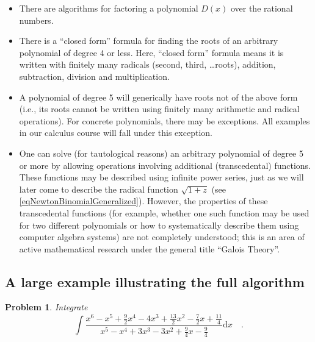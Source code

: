 \documentclass[12pt]{book}
\newcommand{\diff}{\text{d}}
\newtheorem{problem}{Problem}[section]
\begin{document}
\begin{itemize}
\item There are algorithms for factoring a polynomial $D(x)$ over the rational numbers.
\item There is a ``closed form'' formula for finding the roots of an arbitrary polynomial of degree 4 or less. Here, ``closed form'' formula means it is written with finitely many radicals (second, third, \dots roots), addition, subtraction, division and multiplication.
\item A polynomial of degree 5 will generically have roots not of the above form (i.e., its roots cannot be written using finitely many arithmetic and radical operations). For concrete polynomials, there may be exceptions. All examples in our calculus course will fall under this exception.
\item One can solve (for tautological reasons) an arbitrary polynomial of degree 5 or more by allowing operations involving additional (transcedental) functions. These functions may be described using infinite power series, just as we will later come to describe the radical function $\sqrt{1+z}$ (see \eqref{eqNewtonBinomialGeneralized}). However, the properties of these transcedental functions (for example, whether one such function may be used for two different polynomials or how to systematically describe them using computer algebra systems) are not completely understood; this is an area of active mathematical research under the general title ``Galois Theory''.
\end{itemize}

\subsection{A large example illustrating the full algorithm }
\begin{problem}
Integrate 
\[
\int \frac{x^{6}-x^{5}+\frac{9}{2} x^{4}-4 x^{3}+\frac{13}{2} x^{2}-\frac{7}{2} x+\frac{11}{4}}{x^{5}-x^{4}+3 x^{3}-3 x^{2}+\frac{9}{4} x-\frac{9}{4}} \diff x\quad .
\]
\end{problem}
\end{document}
